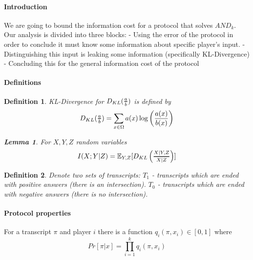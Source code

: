 \documentclass{article}
\newcommand{\Dfrac}[2]{%
  \ooalign{%
    $\genfrac{}{}{1.2pt}1{#1}{#2}$\cr%
    $\color{white}\genfrac{}{}{.4pt}1{\phantom{#1}}{\phantom{#2}}$}%
}
\theoremstyle{plain}
\newtheorem{lemma}[theorem]{Lemma}
\newtheorem{definition}{Definition}
\begin{document}
\paragraph{Introduction}
We are going to bound the information cost for a protocol that solves $AND_k$. Our analysis is divided into three blocks:  - Using the error of the protocol in order to conclude it must know some information about specific player's input.  - Distinguishing this input is leaking some information (specifically KL-Divergence)  - Concluding this for the general information cost of the protocol \newline
\paragraph{Definitions}

\begin{definition}
KL-Divergence for $D_{KL}(\Dfrac{a}{b})$ is defined by
\begin{equation*} 
    D_{KL}(\Dfrac{a}{b}) = \sum_{x \in \Omega} a(x)\log \left(\frac{a(x)}{b(x)}\right)
\end{equation*}

\begin{lemma}
    For $X, Y, Z$ random variables
    \begin{equation*}
        I(X;Y|Z) = \mathbb{E}_{Y,Z}[D_{KL}\left(\Dfrac{X|Y,Z}{X|Z}\right)]
    \end{equation*}
\end{lemma}

\end{definition}

\begin{definition}
    Denote two sets of transcripts: \newline
    $T_1$ - transcripts which are ended with positive answers (there is an intersection). \newline
    $T_0$ - transcripts which are ended with negative answers (there is no intersection).
\end{definition}

\paragraph{Protocol properties}
For a transcript $\pi$ and player $i$ there is a function $q_i(\pi, x_i) \in [0,1]$ where
\begin{equation*}
    Pr[\pi | x] = \prod_{i=1}^{k}q_i(\pi, x_i )
\end{equation*}
\end{document}

